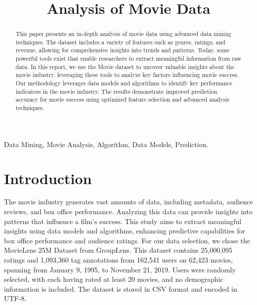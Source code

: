 \documentclass[conference]{IEEEtran}
\begin{document}
\title{Analysis of Movie Data \vspace{-2mm}}

\author{
}

\maketitle

\begin{abstract}
This paper presents an in-depth analysis of movie data using advanced data mining techniques. The dataset includes a variety of features such as genres, ratings, and revenue, allowing for comprehensive insights into trends and patterns. Today, some powerful tools exist that enable researchers to extract meaningful information from raw data. In this report, we use the Movie dataset to uncover valuable insights about the movie industry, leveraging these tools to analyze key factors influencing movie success. Our methodology leverages data models and algorithms to identify key performance indicators in the movie industry. The results demonstrate improved prediction accuracy for movie success using optimized feature selection and advanced analysis techniques.
\end{abstract}

\begin{IEEEkeywords}
Data Mining, Movie Analysis, Algorithm, Data Models, Prediction.
\end{IEEEkeywords}

\section{Introduction}
The movie industry generates vast amounts of data, including metadata, audience reviews, and box office performance. Analyzing this data can provide insights into patterns that influence a film's success. This study aims to extract meaningful insights using data models and algorithms, enhancing predictive capabilities for box office performance and audience ratings.
For our data selection, we chose the MovieLens 25M Dataset from GroupLens.
This dataset contains 25,000,095 ratings and 1,093,360 tag annotations from 162,541 users on 62,423 movies, spanning from January 9, 1995, to November 21, 2019.
Users were randomly selected, with each having rated at least 20 movies, and no demographic information is included.
The dataset is stored in CSV format and encoded in UTF-8.
\end{document}

